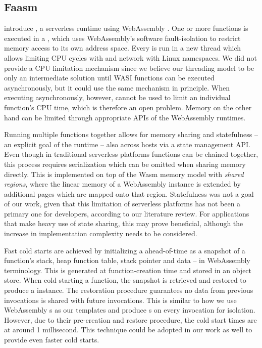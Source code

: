 \subsection{Faasm}

\citeauthor{Shillaker2020} introduce , a serverless runtime using WebAssembly \cite{Shillaker2020}. One or more functions is executed in a , which uses WebAssembly's software fault-isolation to restrict memory access to its own address space. Every  is run in a new thread which allows limiting CPU cycles with  and network with Linux namespaces.
We did not provide a CPU limitation mechanism since we believe our threading model to be only an intermediate solution until WASI functions can be executed asynchronously, but it could use the same  mechanism in principle. When executing asynchronously, however,  cannot be used to limit an individual function's CPU time, which is therefore an open problem. Memory on the other hand can be limited through appropriate APIs of the WebAssembly runtimes.

Running multiple functions together allows for memory sharing and statefulness -- an explicit goal of the runtime --  also across hosts via a state management API. Even though in traditional serverless platforms functions can be chained together, this process requires serialization which can be omitted when sharing memory directly. This is implemented on top of the Wasm memory model with \emph{shared regions}, where the linear memory of a WebAssembly instance is extended by additional pages which are mapped onto that region.
Statefulness was not a goal of our work, given that this limitation of serverless platforms has not been a primary one for developers, according to our literature review. For applications that make heavy use of state sharing, this may prove beneficial, although the increase in implementation complexity needs to be considered.

Fast cold starts are achieved by initializing a  ahead-of-time as a snapshot of a function's stack, heap function table, stack pointer and data -- in WebAssembly terminology. This is generated at function-creation time and stored in an object store. When cold starting a function, the snapshot is retrieved and restored to produce a  instance. The restoration procedure guarantees no data from previous invocations is shared with future invocations. This is similar to how we use WebAssembly s as our templates and produce s on every invocation for isolation.
However, due to their pre-creation and restore procedure, the cold start times are at around 1 millisecond.
This technique could be adopted in our work as well to provide even faster cold starts.

